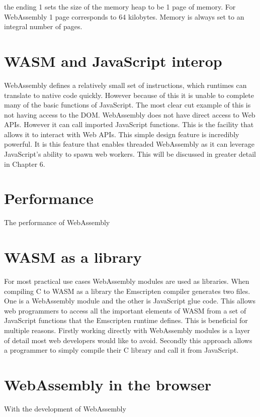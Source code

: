 \documentclass[11pt]{book}
\begin{document}
the ending 1 sets the size of the memory heap to be 1 page of memory. For WebAssembly 1 page corresponds to 64 kilobytes. Memory is always set to an integral number of pages.


\section{WASM and JavaScript interop}

WebAssembly defines a relatively small set of instructions, which runtimes can translate to native code quickly. However because of this it is unable to complete many of the basic functions of JavaScript. The most clear cut example of this is not having access to the DOM. 
WebAssembly does not have direct access to Web APIs. However it can call imported JavaScript functions. This is the facility that allows it to interact with Web APIs. This simple design feature is incredibly powerful. It is this feature that enables threaded WebAssembly as it can leverage JavaScript's ability to spawn web workers. This will be discussed in greater detail in Chapter 6.

\section{Performance}

The performance of WebAssembly

\section{WASM as a library}

For most practical use cases WebAssembly modules are used as libraries. When compiling C to WASM as a library the Emscripten compiler generates two files. One is a WebAssembly module and the other is JavaScript glue code. This allows web programmers to access all the important elements of WASM from a set of JavaScript functions that the Emscripten runtime defines. This is beneficial for multiple reasons. Firstly working directly with WebAssembly modules is a layer of detail most web developers would like to avoid. Secondly this approach allows a programmer to simply compile their C library and call it from JavaScript. 

\section{WebAssembly in the browser}

With the development of WebAssembly
\end{document}
